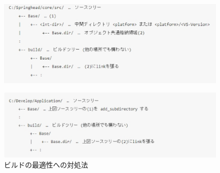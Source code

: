 \begin{narrow}[20pt]
	\begin{figure}[h]
	    \begin{center}
	    \includegraphics[width=1\textwidth]{fig/ApproachToBuildOptimization-1.eps}
	    \end{center}
	\end{figure}
	\begin{figure}[h]
	    \begin{center}
	    \includegraphics[width=1\textwidth]{fig/ApproachToBuildOptimization-2.eps}
	    \end{center}
	    \caption{ビルドの最適性への対処法}
	    \label{fig:ApproachToBuildOptimization}
	\end{figure}


\end{narrow}
